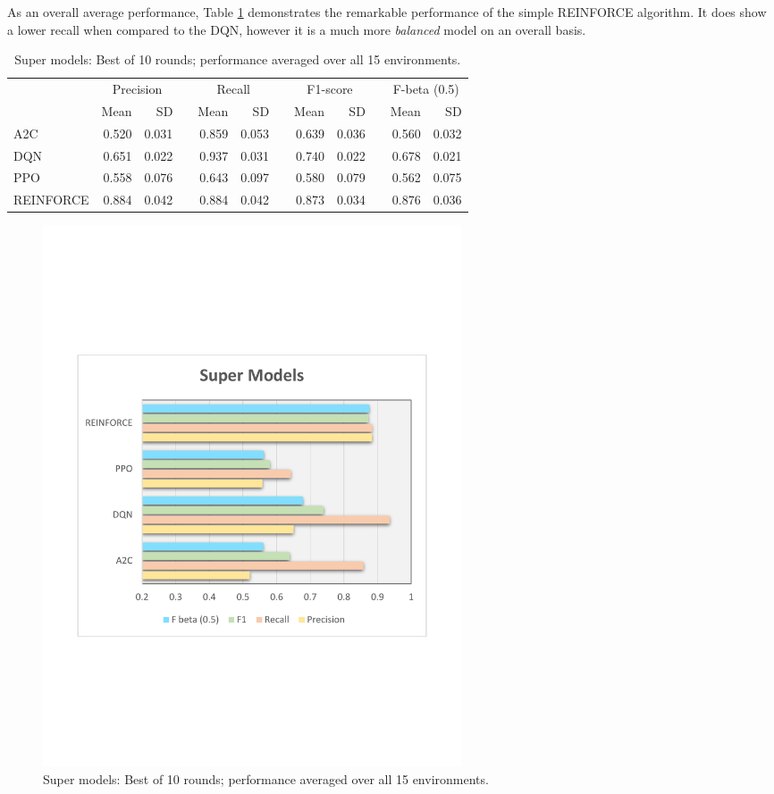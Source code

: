 \documentclass[a4paper, 12pt]{article}
\newcommand{\rowspace}[1]{\renewcommand{\arraystretch}{#1}}
\begin{document}
As an overall average performance, Table \ref{tbl:supermodels} demonstrates the remarkable performance of the simple REINFORCE algorithm. It does show a lower recall when compared to the DQN, however it is a much more \textit{balanced} model on an overall basis.
\begin{table}[h]\centering
	\sffamily
	\rowspace{1.3}
	\begin{tabular}{@{}l rr c rr c rr c rr@{}}
		\arrayrulecolor{black!40}\toprule
		& \multicolumn{2}{c}{Precision} & \phantom{i} & \multicolumn{2}{c}{Recall} & \phantom{i} & \multicolumn{2}{c}{F1-score} & \phantom{i} & \multicolumn{2}{c}{F-beta (0.5)} \\
		\cmidrule{2-3} \cmidrule{5-6} \cmidrule{8-9} \cmidrule{11-12} 
		
		&Mean &SD & &Mean &SD & &Mean &SD& &Mean & SD\\ \midrule
		A2C & 0.520 & 0.031 & &0.859 & 0.053 & & 0.639 & 0.036 & &0.560 &0.032 \\
		DQN & 0.651 & 0.022 & &0.937 & 0.031 & & 0.740 & 0.022 & &0.678 &0.021 \\
		PPO & 0.558 & 0.076 & &0.643 & 0.097 & & 0.580 & 0.079 & &0.562 &0.075 \\
		REINFORCE & \textcolor{dblue}{0.884} & 0.042 & &\textcolor{dblue}{0.884} & 0.042 & & \textcolor{dblue}{0.873} & 0.034 & &\textcolor{dblue}{0.876} &0.036 \\
		\bottomrule
	\end{tabular}
	\caption{Super models: Best of 10 rounds; performance averaged over all 15 environments.}
	\label{tbl:supermodels}
\end{table}
\begin{figure}[!htbp]
	\centering
	\includegraphics[width=0.6\textwidth, trim={1.5cm 7cm 1cm 7cm}]{images/SuperModelsPlot.pdf}  
	\caption{Super models: Best of 10 rounds; performance averaged over all 15 environments.}
	\label{fig:supermodels}
\end{figure}
\end{document}
